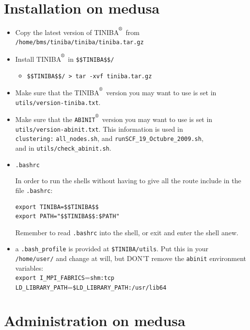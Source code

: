 \documentclass[12pt,leqno]{article}
\def\reg{\textsuperscript{\textregistered}}
\numberwithin{equation}{section}
\begin{document}
\section{Installation  on medusa}
\begin{itemize}

\item Copy the latest version of TINIBA$^\reg$ from \\
\verb=/home/bms/tiniba/tiniba/tiniba.tar.gz=

\item Install TINIBA$^\reg$ in \verb=$$TINIBA$$/=
\begin{itemize}
\item  \verb=$$TINIBA$$/ > tar -xvf tiniba.tar.gz =
\end{itemize}
\item
Make sure that the TINIBA$^\reg$ version you may want to use is set
in \verb=utils/version-tiniba.txt=.

\item
  Make sure that the \verb=ABINIT=$^\reg$ version you may want to use is set
in \verb=utils/version-abinit.txt=.
 This information is used in\\ 
\verb=clustering:=
\verb=all_nodes.sh=, and
\verb=runSCF_19_Octubre_2009.sh=, \\and in
 \verb=utils/check_abinit.sh=.
\label{av}

\item\verb=.bashrc=

In order to run
the shells without having to give all
the route include in the file
 \verb=.bashrc=:
\begin{verbatim}
export TINIBA=$$TINIBA$$
export PATH="$$TINIBA$$:$PATH"
\end{verbatim}
Remember to read \verb=.bashrc= into the shell, or exit and enter the
shell anew.
\item a \verb=.bash_profile= is provided at \verb=$TINIBA/utils=. Put
  this in your \verb=/home/user/= and change at will, but DON'T remove
  the \verb=abinit= environment variables:\\
\verb=export I_MPI_FABRICS==\verb=shm:tcp=\\
\verb=LD_LIBRARY_PATH==\verb=$LD_LIBRARY_PATH:/usr/lib64=

\end{itemize}

\section{Administration  on medusa}
\end{document}
